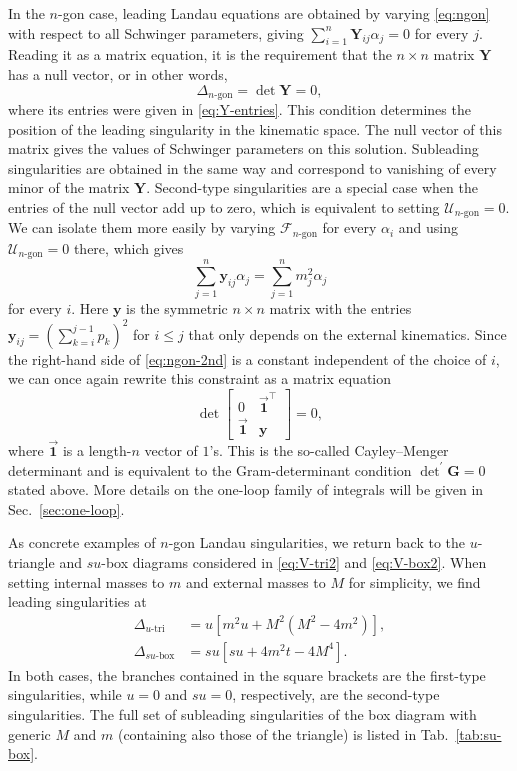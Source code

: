 \documentclass[12pt]{article}
\numberwithin{figure}{section}
\def \be {\begin{equation}}
\def \ee {\end{equation}}
\def \U {\mathcal{U}}
\def \F {\mathcal{F}}
\def \leq {\leqslant}
\def \triangle {\mathrm{tri}}
\def \boxx {\mathrm{box}}
\def \Y {\mathbf{Y}}
\begin{document}
    In the $n$-gon case, leading Landau equations are obtained by varying \eqref{eq:ngon} with respect to all Schwinger parameters, giving $\sum_{i=1}^{n} \Y_{ij} \alpha_j = 0$ for every $j$. Reading it as a matrix equation, it is the requirement that the $n\times n$ matrix $\Y$ has a null vector, or in other words,
    \be
    \Delta_{n\text{-gon}} = \det \Y = 0,
    \ee
    where its entries were given in \eqref{eq:Y-entries}.
    This condition determines the position of the leading singularity in the kinematic space. The null vector of this matrix gives the values of Schwinger parameters on this solution. Subleading singularities are obtained in the same way and correspond to vanishing of every minor of the matrix $\mathbf{Y}$. Second-type singularities are a special case when the entries of the null vector add up to zero, which is equivalent to setting $\U_{n\text{-gon}} = 0$. We can isolate them more easily by varying $\F_{n\text{-gon}}$ for every $\alpha_i$ and using $\U_{n\text{-gon}} = 0$ there, which gives
    \be\label{eq:ngon-2nd}
    \sum_{j=1}^{n} \mathbf{y}_{ij} \alpha_j = \sum_{j=1}^{n} m_j^2 \alpha_j
    \ee
    for every $i$. Here $\mathbf{y}$ is the symmetric $n\times n$ matrix with the entries $\mathbf{y}_{ij} = ({\textstyle\sum}_{k=i}^{j-1}p_{k})^2$ for $i\leq j$ that only depends on the external kinematics. Since the right-hand side of \eqref{eq:ngon-2nd} is a constant independent of the choice of $i$, we can once again rewrite this constraint as a matrix equation
    \be
    \det \begin{bmatrix}
    0 & \vec{\mathbf{1}}^\intercal \\
    \vec{\mathbf{1}} & \mathbf{y}
    \end{bmatrix} = 0,
    \ee
    where $\vec{\mathbf{1}}$ is a length-$n$ vector of $1$'s. This is the so-called Cayley--Menger determinant and is equivalent to the Gram-determinant condition $\det^\prime \mathbf{G} = 0$ stated above. More details on the one-loop family of integrals will be given in Sec.~\ref{sec:one-loop}.
    
    As concrete examples of $n$-gon Landau singularities, we return back to the $u$-triangle and $su$-box diagrams considered in \eqref{eq:V-tri2} and \eqref{eq:V-box2}. When setting internal masses to $m$ and external masses to $M$ for simplicity, we find leading singularities at 
    \begin{align}
    \Delta_{u\text{-}\triangle} &= u[m^2 u + M^2 (M^2 - 4m^2)],\label{eq:Delta-tri}\\
    \Delta_{su\text{-}\boxx} &= su[su + 4m^2 t - 4M^4].\label{eq:Delta-box}
    \end{align}
    In both cases, the branches contained in the square brackets are the first-type singularities, while $u=0$ and $su=0$, respectively, are the second-type singularities. The full set of subleading singularities of the box diagram with generic $M$ and $m$ (containing also those of the triangle) is listed in Tab.~\ref{tab:su-box}.
    
\end{document}

